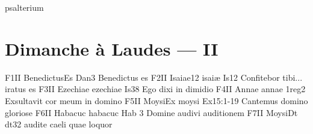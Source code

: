 psalterium
\chapter{Dimanche à Laudes --- II}











F1II	BenedictusEs	Dan3 Benedictus es
F2II	Isaiae12		isaiæ Is12 Confitebor tibi... iratus es
F3II	Ezechiae		ezechiae Is38 Ego dixi in dimidio
F4II	Annae			annae 1reg2 Exsultavit cor meum in domino
F5II	MoysiEx			moysi Ex15:1-19 Cantemus domino gloriose
F6II	Habacuc			habacuc Hab 3 Domine audivi auditionem
F7II	MoysiDt			dt32 audite caeli quae loquor